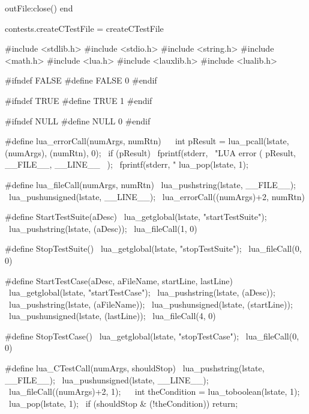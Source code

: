   outFile:close()
end

contests.createCTestFile = createCTestFile
\stopLuaCode

\startCHeader
#include <stdlib.h>
#include <stdio.h>
#include <string.h>
#include <math.h>
#include <lua.h>
#include <lauxlib.h>
#include <lualib.h>

#ifndef FALSE
#define FALSE 0
#endif

#ifndef TRUE
#define TRUE 1
#endif

#ifndef NULL
#define NULL 0
#endif

#define lua_errorCall(numArgs, numRtn)                     \
{                                                          \
  int pResult = lua_pcall(lstate, (numArgs), (numRtn), 0); \
  if (pResult) {                                           \
    fprintf(stderr,                                        \
      "LUA error (%
      pResult, __FILE__, __LINE__                          \
    );                                                     \
    fprintf(stderr, "%
    lua_pop(lstate, 1);                                    \
  }                                                        \
}

#define lua_fileCall(numArgs, numRtn)            \
  lua_pushstring(lstate, __FILE__);              \
  lua_pushunsigned(lstate, __LINE__);            \
  lua_errorCall((numArgs)+2, numRtn)

#define StartTestSuite(aDesc)              \
  lua_getglobal(lstate, "startTestSuite"); \
  lua_pushstring(lstate, (aDesc));         \
  lua_fileCall(1, 0)

#define StopTestSuite()                   \
  lua_getglobal(lstate, "stopTestSuite"); \
  lua_fileCall(0, 0)

#define StartTestCase(aDesc, aFileName, startLine, lastLine) \
  lua_getglobal(lstate, "startTestCase");                    \
  lua_pushstring(lstate, (aDesc));                           \
  lua_pushstring(lstate, (aFileName));                       \
  lua_pushunsigned(lstate, (startLine));                     \
  lua_pushunsigned(lstate, (lastLine));                      \
  lua_fileCall(4, 0)

#define StopTestCase()                   \
  lua_getglobal(lstate, "stopTestCase"); \
  lua_fileCall(0, 0)

#define lua_CTestCall(numArgs, shouldStop)       \
  lua_pushstring(lstate, __FILE__);              \
  lua_pushunsigned(lstate, __LINE__);            \
  lua_fileCall((numArgs)+2, 1);                  \
  {                                              \
    int theCondition = lua_toboolean(lstate, 1); \
    lua_pop(lstate, 1);                          \
    if (shouldStop & (!theCondition)) return;    \
  }
\stopCHeader

